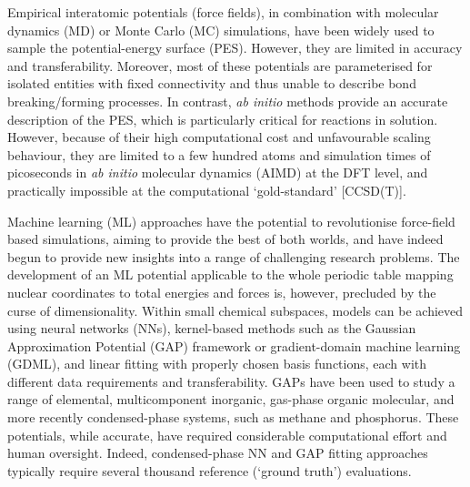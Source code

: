 \documentclass[../../main.tex]{subfiles}
\begin{document}
Empirical interatomic potentials (force fields), in combination with molecular dynamics (MD) or Monte Carlo (MC) simulations, have been widely used to sample the potential-energy surface (PES). However, they are limited in accuracy and transferability.\cite{Lindorff-Larsen2012} Moreover, most of these potentials are parameterised for isolated entities with fixed connectivity and thus unable to describe bond breaking/forming processes. In contrast, \emph{ab initio} methods provide an accurate description of the PES, which is particularly critical for reactions in solution. However, because of their high computational cost and unfavourable scaling behaviour, they are limited to a few hundred atoms and simulation times of picoseconds in \emph{ab initio} molecular dynamics (AIMD) at the DFT level, and practically impossible at the computational ‘gold-standard’ [CCSD(T)].\cite{Iftimie2005} 

Machine learning (ML) approaches have the potential to revolutionise force-field based simulations, aiming to provide the best of both worlds,\cite{Noe2020, Mueller2020, Unke2020} and have indeed begun to provide new insights into a range of challenging research problems.\cite{Khaliullin2011, Sosso2013, Niu2020, Cheng2020nature, Deringer2021, Ang2021, Cole2020, Rufa2020, Gastegger2017, Li2021} The development of an ML potential applicable to the whole periodic table mapping nuclear coordinates to total energies and forces is, however, precluded by the curse of dimensionality. Within small chemical subspaces, models can be achieved using neural networks (NNs),\cite{Unke2020, Behler2007, Behler2017, Smith2017, Schutt2017, Unke2019} kernel-based methods such as the Gaussian Approximation Potential (GAP) framework\cite{Bartok2010, Bartok2015} or gradient-domain machine learning (GDML),\cite{Chmiela2017} and linear fitting with properly chosen basis functions,\cite{Thompson2015, Shapeev2016} each with different data requirements and transferability.\cite{Zuo2020} GAPs have been used to study a range of elemental,\cite{Szlachta2014, Deringer2017, Bartok2018} multicomponent inorganic,\cite{Sivaraman2020, Mocanu2018} gas-phase organic molecular,\cite{Cole2020, Dral2020} and more recently condensed-phase systems, such as methane\cite{Veit2019} and phosphorus.\cite{Deringer2020} These potentials, while accurate, have required considerable computational effort and human oversight. Indeed, condensed-phase NN\cite{Cheng2019, Schran2020} and GAP fitting approaches typically require several thousand reference (`ground truth') evaluations.
\end{document}
